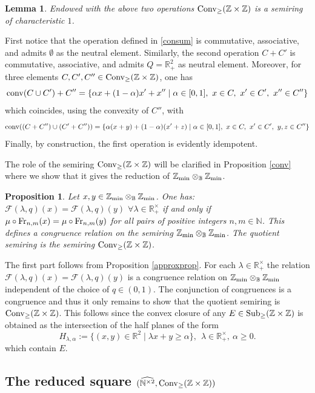 \documentclass[noams,lp]{compositio}
\newtheorem{prop}[thm]{Proposition}
\newtheorem{lem}[thm]{Lemma}
\def\B{{\mathbb B}}
\def\N{{\mathbb N}}
\def\R{{\mathbb R}}
\def\Z{{\mathbb Z}}
\def\cF{{\mathcal F}}
\def\sub{{\rm Sub}_\geq}
\def\conv{{\rm Conv}_\geq}
\def\zmin{\Z_{\rm min}}
\def\fr{{\rm Fr}}
\def\nbo{{\zmin\otimes_\B \zmin}}
\def\wntb{{\widehat{\N^{\times 2}}}}
\def\arithc{{(\wntb,\conv(\Z\times \Z))}}
\begin{document}
\begin{lem}\label{approx0} Endowed with the above two operations $\conv(\Z\times \Z)$ is a semiring of characteristic $1$.
\end{lem}
\proof First notice that the operation defined in \eqref{consum} is commutative, associative, and admits $\emptyset$ as the neutral element. Similarly, the second operation $C+C'$  is commutative, associative, and admits $Q=\R_+^2$ as neutral element. Moreover, for three elements $C,C',C''\in \conv(\Z\times \Z)$, one has 
$$
{\rm conv}(C\cup C')+C''=\{\alpha x+(1-\alpha)x'+x''\mid \alpha \in [0,1],\   x\in C, \  x'\in C', \ x''\in C''\}
$$
which coincides, using the convexity of $C''$, with 
$$
{\rm conv}((C+C'')\cup (C'+C''))=\{\alpha (x+y)+(1-\alpha)(x'+z)\mid \alpha \in [0,1],\   x\in C, \  x'\in C', \ y,z\in C''\}
$$
Finally, by construction, the first operation is evidently idempotent.\endproof

The role of the semiring $\conv(\Z\times \Z)$ will be clarified in Proposition \ref{conv} where we show that it gives the reduction of $\nbo$.

\begin{prop}\label{approx}
Let $x,y\in \zmin\otimes_\B \zmin$. One has:  $\cF(\lambda,q)(x)=
\cF(\lambda,q)(y)$ $\forall\lambda\in \R_+^\times$ if and only if $\mu\circ \fr_{n,m}(x)=\mu\circ \fr_{n,m}(y)$ for all pairs of positive integers $n,m\in \N$. This defines a congruence relation on the semiring $\zmin\otimes_\B \zmin$. The quotient semiring is the semiring $\conv(\Z\times \Z)$.
\end{prop}
\proof 
 The first part follows from Proposition \ref{approxprop}. For each $\lambda\in \R_+^\times$ the relation $\cF(\lambda,q)(x)=
\cF(\lambda,q)(y)$ is a congruence relation on $\nbo$ independent of the choice of $q\in (0,1)$. The conjunction of congruences is a congruence and thus it only remains to show that the quotient semiring is $\conv(\Z\times \Z)$. This follows since the convex closure of any $E\in \sub(\Z\times \Z)$ is obtained as the intersection of the half planes of the form
$$
H_{\lambda,\alpha}:=\{(x,y)\in \R^2\mid \lambda x+y\geq \alpha\}, \   \   \lambda\in \R_+^\times, \  \alpha \geq 0.
$$
which contain $E$.\endproof



\subsection{The reduced square $\arithc$}
\end{document}
